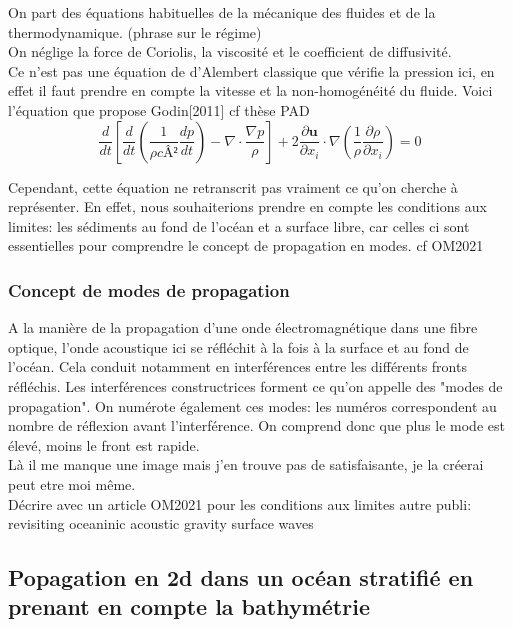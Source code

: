 \documentclass{rapportECC}
\begin{document}
On part des équations habituelles de la mécanique des fluides et de la thermodynamique. (phrase sur le régime)
\\
On néglige la force de Coriolis, la viscosité et le coefficient de diffusivité.
\\
Ce n'est pas une équation de d'Alembert classique que vérifie la pression ici, en effet il faut prendre en compte la vitesse et la non-homogénéité du fluide. Voici l'équation que propose Godin[2011] cf thèse PAD
\begin{equation}
    \frac{d}{dt}[\frac{d}{dt}(\frac{1}{\rho cÂ²}\frac{dp}{dt}) - \nabla \cdot \frac{\nabla p}{\rho}] + 2\frac{\partial \mathbf{u}}{\partial x_i} \cdot \nabla (\frac{1}{\rho}\frac{\partial \rho}{\partial x_i}) = 0
\end{equation}

Cependant, cette équation ne retranscrit pas vraiment ce qu'on cherche à représenter. En effet, nous souhaiterions prendre en compte les conditions aux limites: les sédiments au fond de l'océan et a surface libre, car celles ci sont essentielles pour comprendre le concept de propagation en modes. cf OM2021

\subsubsection{Concept de modes de propagation}

A la manière de la propagation d'une onde électromagnétique dans une fibre optique, l'onde acoustique ici se réfléchit à la fois à la surface et au fond de l'océan. Cela conduit notamment en interférences entre les différents fronts réfléchis. Les interférences constructrices forment ce qu'on appelle des "modes de propagation". On numérote également ces modes: les numéros correspondent au nombre de réflexion avant l'interférence. On comprend donc que plus le mode est élevé, moins le front est rapide. \\
Là il me manque une image mais j'en trouve pas de satisfaisante, je la créerai peut etre moi même.
\\

Décrire avec un article OM2021 pour les conditions aux limites
autre publi: revisiting oceaninic acoustic gravity surface waves

\subsection{Popagation en 2d dans un océan stratifié en prenant en compte la bathymétrie}
\end{document}

